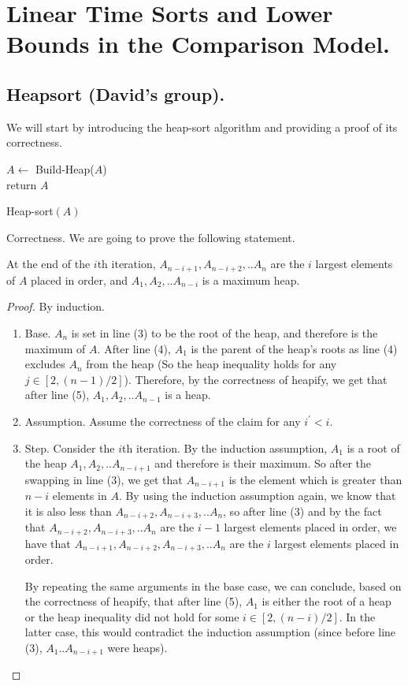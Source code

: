 \ifdefined\BOOK
\else
\setcounter{chapter}{5}
\fi

\chapter{Linear Time Sorts and Lower Bounds in the Comparison Model.} 
\section{Heapsort (David's group).}
We will start by introducing the heap-sort algorithm and providing a proof of its correctness.

\begin{algorithm}
    $A \leftarrow$ Build-Heap($A$)\\
	  return $A$
\caption{Heap-sort$(A)$}
  \end{algorithm}
Correctness. We are going to prove the following statement.
  \begin{claim}   
At the end of the $i$th iteration, $A_{n-i+1},A_{n-i+2},..A_{n}$ are the $i$ largest elements of $A$ placed in order, and $A_{1},A_{2},..A_{n-i}$ is a maximum heap.
  \end{claim}
\begin{proof}
By induction.
\begin{enumerate}
  \item Base. $A_{n}$ is set in line (3) to be the root of the heap, and therefore is the maximum of $A$. After line (4), $A_{1}$ is the parent of the heap's roots as line (4) excludes $A_{n}$ from the heap (So the heap inequality holds for any $j\in [2,(n-1)/2]$). Therefore, by the correctness of heapify, we get that after line (5), $A_{1},A_{2},..A_{n-1}$ is a heap.
  \item Assumption. Assume the correctness of the claim for any $i^{\prime}<i$.
  \item Step. Consider the $i$th iteration. By the induction assumption, $A_{1}$ is a root of the heap $A_{1},A_{2},..A_{n-i+1}$ and therefore is their maximum. So after the swapping in line (3), we get that $A_{n-i+1}$ is the element which is greater than $n-i$ elements in $A$. By using the induction assumption again, we know that it is also less than $A_{n-i+2},A_{n-i+3},..A_{n}$, so after line (3) and by the fact that $A_{n-i+2},A_{n-i+3},..A_{n}$ are the $i-1$ largest elements placed in order, we have that $A_{n-i+1},A_{n-i+2},A_{n-i+3},..A_{n}$ are the $i$ largest elements placed in order. 

    By repeating the same arguments in the base case, we can conclude, based on the correctness of heapify, that after line (5), $A_{1}$ is either the root of a heap or the heap inequality did not hold for some $i\in [2,(n-i)/2]$. In the latter case, this would contradict the induction assumption (since before line (3), $A_{1}..A_{n-i+1}$ were heaps).
\end{enumerate}
\end{proof}

